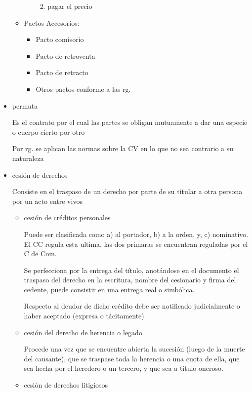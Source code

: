 \documentclass[]{article}
\providecommand{\tightlist}{%
  \setlength{\itemsep}{0pt}\setlength{\parskip}{0pt}}
\begin{document}
\begin{itemize}
\begin{itemize}
\begin{itemize}
      \begin{enumerate}
      \def\labelenumi{\arabic{enumi}.}
      \setcounter{enumi}{1}
      \tightlist
      \item
        pagar el precio
      \end{enumerate}
    \end{itemize}
  \item
    Pactos Accesorios:

    \begin{itemize}
    \tightlist
    \item
      Pacto comisorio
    \item
      Pacto de retroventa
    \item
      Pacto de retracto
    \item
      Otros pactos conforme a las rg.
    \end{itemize}
  \end{itemize}
\item
  permuta

  Es el contrato por el cual las partes se obligan mutuamente a dar una
  especie o cuerpo cierto por otro

  Por rg. se aplican las normas sobre la CV en lo que no sea contrario a
  su naturaleza
\item
  cesión de derechos

  Consiste en el traspaso de un derecho por parte de su titular a otra
  persona por un acto entre vivos

  \begin{itemize}
  \item
    cesión de créditos personales

    Puede ser clasificada como a) al portador, b) a la orden, y, c)
    nominativo. El CC regula esta ultima, las dos primaras se encuentran
    reguladas por el C de Com.

    Se perfecciona por la entrega del título, anotándose en el documento
    el traspaso del derecho en la escritura, nombre del cesionario y
    firma del cedente, puede consistir en una entrega real o simbólica.

    Respecto al deudor de dicho crédito debe ser notificado
    judicialmente o haber aceptado (expresa o tácitamente)
  \item
    cesión del derecho de herencia o legado

    Procede una vez que se encuentre abierta la sucesión (luego de la
    muerte del causante), que se traspase toda la herencia o una cuota
    de ella, que sea hecha por el heredero o un tercero, y que sea a
    título oneroso.
  \item
    cesión de derechos litigiosos


\end{itemize}
\end{itemize}
\end{document}
